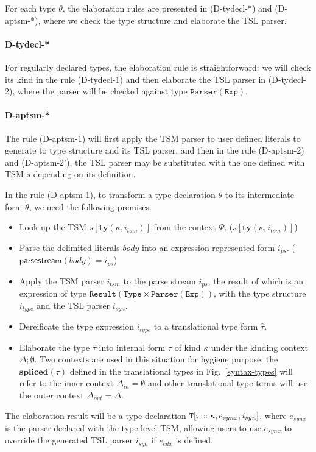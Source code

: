 For each type $\theta$, the elaboration rules are presented in (D-tydecl-*) and (D-aptsm-*), where we check the type structure and elaborate the TSL parser.
\paragraph{D-tydecl-*} For regularly declared types, the elaboration rule is straightforward: we will check its kind in the rule (D-tydecl-1) and then elaborate the TSL parser in (D-tydecl-2), where the parser will be checked against type $\mathtt{Parser(Exp)}$.

\paragraph{D-aptsm-*} The rule (D-aptsm-1) will first apply the TSM parser to user defined literals to generate to type structure and its TSL parser, and then in the rule (D-aptsm-2) and (D-aptsm-2'), the TSL parser may be substituted with the one defined with TSM $s$ depending on its definition. 

In the rule (D-aptsm-1), to transform a type declaration $\theta$ to its intermediate form $\mathring\theta$, we need the following premises:
\begin{itemize}\itemsep0pt
\item Look up the TSM $s[\mathbf{ty}(\kappa,i_{tsm})]$ from the context $\Psi$. ($s[\mathbf{ty}(\kappa,i_{tsm})]$)
\item Parse the delimited literals $body$ into an expression represented form $i_{ps}$. ($\mathsf{parsestream}(body)=i_{ps}$)
\item Apply the TSM parser $i_{tsm}$ to the parse stream $i_{ps}$, the result of which is an expression of type $\mathtt{Result(Type \times Parser(Exp))}$, with the type structure $i_{type}$ and the TSL parser $i_{syn}$.
\item Dereificate the type expression $i_{type}$ to a translational type form $\hat\tau$.
\item Elaborate the type $\hat\tau$ into internal form $\tau$ of kind $\kappa$ under the kinding context $\Delta;\emptyset$. Two contexts are used in this situation for hygiene purpose: the $\mathbf{spliced}(\tau)$ defined in the translational types in Fig.~\ref{syntax-types} will refer to the inner context $\Delta_{in}=\emptyset$ and other translational type terms will use the outer context $\Delta_{out}=\Delta$.
\end{itemize}
The elaboration result will be a type declaration $\mathtt{T}[\tau::\kappa,e_{synx},i_{syn}]$, where $e_{synx}$ is the parser declared with the type level TSM, allowing users to use $e_{synx}$ to override the generated TSL parser $i_{syn}$ if $e_{edx}$ is defined.

